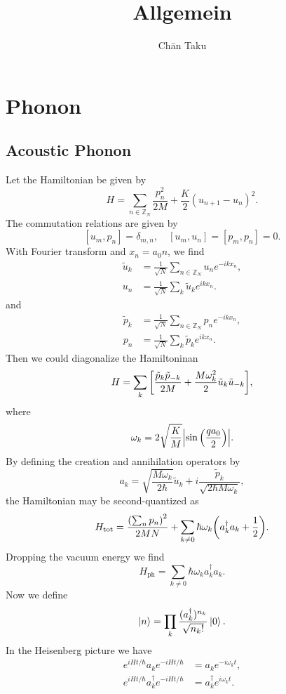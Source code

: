 \documentclass{article}
\title{Allgemein}
\author{Ch\=an Taku}
\begin{document}
\maketitle

\section{Phonon}

\subsection{Acoustic Phonon}

Let the Hamiltonian be given by
\[ H = \sum_{n\in \mathbb{Z}_N} \frac{p_n^2}{2M} + \frac{K}{2}(u_{n+1} - u_n)^2. \]
The commutation relations are given by
\[ [u_m, p_n] = \delta_{m,n},\quad [u_m, u_n] = [p_m, p_n] = 0. \]
With Fourier transform and $x_n = a_0 n$, we find
\begin{align*}
    \tilde{u}_k &= \frac{1}{\sqrt{N}} \sum_{n\in \mathbb{Z}_N} u_n e^{-ikx_n}, \\
    u_n &= \frac{1}{\sqrt{N}} \sum_k \tilde{u}_k e^{ikx_n}. 
\end{align*}
and
\begin{align*}
    \tilde{p}_k &= \frac{1}{\sqrt{N}} \sum_{n\in \mathbb{Z}_N} p_n e^{-ikx_n}, \\
    p_n &= \frac{1}{\sqrt{N}} \sum_k \tilde{p}_k e^{ikx_n}. 
\end{align*}
Then we could diagonalize the Hamiltoninan
\[ H = \sum_k \qty[\frac{\tilde{p}_k \tilde{p}_{-k}}{2M} + \frac{M \omega_k^2}{2}\tilde{u}_k \tilde{u}_{-k}], \]
where
\[ \omega_k = 2\sqrt{\frac{K}{M}} \abs{\sin\qty(\frac{q a_0}{2})}. \]
By defining the creation and annihilation operators by
\[ a_k = \sqrt{\frac{M\omega_k}{2\hbar}} \tilde{u}_k + i \frac{\tilde{p}_k}{\sqrt{2\hbar M\omega_k}}, \]
the Hamiltonian may be second-quantized as
\[ H_{\mathrm{tot}} = \frac{\qty(\sum_n p_n)^2}{2MN} + \sum_{k\neq 0} \hbar \omega_k\qty(a^\dagger_k a_k + \frac{1}{2}). \]
Dropping the vacuum energy we find
\[ H_{\mathrm{ph}} = \sum_{k\neq 0} \hbar \omega_k a^\dagger_k a_k. \]
Now we define
\[ \ket{n} = \prod_k \frac{(a^\dagger_k)^{n_k}}{\sqrt{n_k!}}\ket{0}. \]
In the Heisenberg picture we have
\begin{align*}
    e^{iHt/\hbar} a_k e^{-iHt/\hbar} &= a_k e^{-i\omega_k t}, \\
    e^{iHt/\hbar} a^\dagger_k e^{-iHt/\hbar} &= a^\dagger_k e^{i\omega_k t}.
\end{align*}
\end{document}
